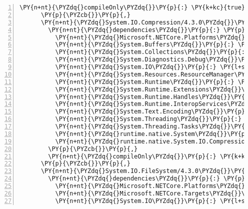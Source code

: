 \begin{Verbatim}[commandchars=\\\{\},numbers=left,firstnumber=1,stepnumber=1,numberblanklines=0]
        \PY{n+nt}{\PYZdq{}compileOnly\PYZdq{}}\PY{p}{:} \PY{k+kc}{true}
      \PY{p}{\PYZcb{}}\PY{p}{,}
      \PY{n+nt}{\PYZdq{}System.IO.Compression/4.3.0\PYZdq{}}\PY{p}{:} \PY{p}{\PYZob{}}
        \PY{n+nt}{\PYZdq{}dependencies\PYZdq{}}\PY{p}{:} \PY{p}{\PYZob{}}
          \PY{n+nt}{\PYZdq{}Microsoft.NETCore.Platforms\PYZdq{}}\PY{p}{:} \PY{l+s+s2}{\PYZdq{}2.1.0\PYZhy{}rc1\PYZdq{}}\PY{p}{,}
          \PY{n+nt}{\PYZdq{}System.Buffers\PYZdq{}}\PY{p}{:} \PY{l+s+s2}{\PYZdq{}4.5.0\PYZhy{}rc1\PYZdq{}}\PY{p}{,}
          \PY{n+nt}{\PYZdq{}System.Collections\PYZdq{}}\PY{p}{:} \PY{l+s+s2}{\PYZdq{}4.3.0\PYZdq{}}\PY{p}{,}
          \PY{n+nt}{\PYZdq{}System.Diagnostics.Debug\PYZdq{}}\PY{p}{:} \PY{l+s+s2}{\PYZdq{}4.3.0\PYZdq{}}\PY{p}{,}
          \PY{n+nt}{\PYZdq{}System.IO\PYZdq{}}\PY{p}{:} \PY{l+s+s2}{\PYZdq{}4.3.0\PYZdq{}}\PY{p}{,}
          \PY{n+nt}{\PYZdq{}System.Resources.ResourceManager\PYZdq{}}\PY{p}{:} \PY{l+s+s2}{\PYZdq{}4.3.0\PYZdq{}}\PY{p}{,}
          \PY{n+nt}{\PYZdq{}System.Runtime\PYZdq{}}\PY{p}{:} \PY{l+s+s2}{\PYZdq{}4.3.0\PYZdq{}}\PY{p}{,}
          \PY{n+nt}{\PYZdq{}System.Runtime.Extensions\PYZdq{}}\PY{p}{:} \PY{l+s+s2}{\PYZdq{}4.3.0\PYZdq{}}\PY{p}{,}
          \PY{n+nt}{\PYZdq{}System.Runtime.Handles\PYZdq{}}\PY{p}{:} \PY{l+s+s2}{\PYZdq{}4.3.0\PYZdq{}}\PY{p}{,}
          \PY{n+nt}{\PYZdq{}System.Runtime.InteropServices\PYZdq{}}\PY{p}{:} \PY{l+s+s2}{\PYZdq{}4.3.0\PYZdq{}}\PY{p}{,}
          \PY{n+nt}{\PYZdq{}System.Text.Encoding\PYZdq{}}\PY{p}{:} \PY{l+s+s2}{\PYZdq{}4.3.0\PYZdq{}}\PY{p}{,}
          \PY{n+nt}{\PYZdq{}System.Threading\PYZdq{}}\PY{p}{:} \PY{l+s+s2}{\PYZdq{}4.3.0\PYZdq{}}\PY{p}{,}
          \PY{n+nt}{\PYZdq{}System.Threading.Tasks\PYZdq{}}\PY{p}{:} \PY{l+s+s2}{\PYZdq{}4.3.0\PYZdq{}}\PY{p}{,}
          \PY{n+nt}{\PYZdq{}runtime.native.System\PYZdq{}}\PY{p}{:} \PY{l+s+s2}{\PYZdq{}4.3.0\PYZdq{}}\PY{p}{,}
          \PY{n+nt}{\PYZdq{}runtime.native.System.IO.Compression\PYZdq{}}\PY{p}{:} \PY{l+s+s2}{\PYZdq{}4.3.0\PYZdq{}}
        \PY{p}{\PYZcb{}}\PY{p}{,}
        \PY{n+nt}{\PYZdq{}compileOnly\PYZdq{}}\PY{p}{:} \PY{k+kc}{true}
      \PY{p}{\PYZcb{}}\PY{p}{,}
      \PY{n+nt}{\PYZdq{}System.IO.FileSystem/4.3.0\PYZdq{}}\PY{p}{:} \PY{p}{\PYZob{}}
        \PY{n+nt}{\PYZdq{}dependencies\PYZdq{}}\PY{p}{:} \PY{p}{\PYZob{}}
          \PY{n+nt}{\PYZdq{}Microsoft.NETCore.Platforms\PYZdq{}}\PY{p}{:} \PY{l+s+s2}{\PYZdq{}2.1.0\PYZhy{}rc1\PYZdq{}}\PY{p}{,}
          \PY{n+nt}{\PYZdq{}Microsoft.NETCore.Targets\PYZdq{}}\PY{p}{:} \PY{l+s+s2}{\PYZdq{}2.1.0\PYZhy{}rc1\PYZdq{}}\PY{p}{,}
          \PY{n+nt}{\PYZdq{}System.IO\PYZdq{}}\PY{p}{:} \PY{l+s+s2}{\PYZdq{}4.3.0\PYZdq{}}\PY{p}{,}

\end{Verbatim}
